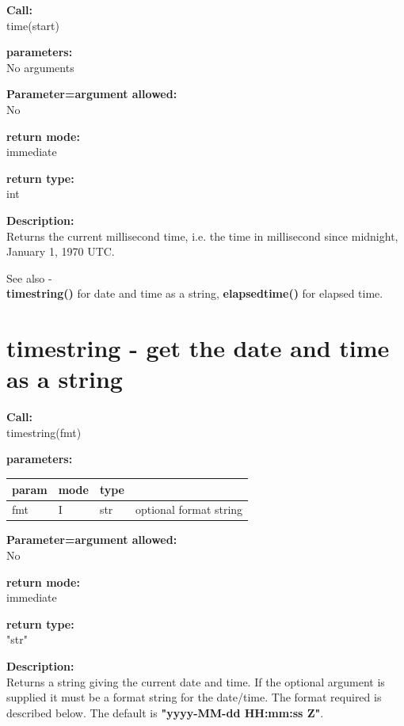         {\bf Call:} \\
        time(start)
        
        {\bf parameters:} \\
        No arguments
        
        {\bf Parameter=argument allowed:} \\
        No
        
        {\bf return mode:} \\
        immediate

        {\bf return type:} \\
        int
        
        {\bf Description:} \\
        Returns the current millisecond time, i.e. the time in millisecond
        since midnight, January 1, 1970 UTC.

        See also - \\
         {\bf timestring()} for date and time
        as a string,
         {\bf elapsedtime()} for
        elapsed time.
 

    \section{timestring - get the date and time as a string}\label{sec:iftimestring}
        
        {\bf Call:} \\
        timestring(fmt)
        
        {\bf parameters:} \\
        \begin{tabular}{| l | l | l | l |}
        \hline
        param  & mode & type & \\
        \hline \hline
        fmt & I & str & optional format string   \\ \hline
        \end{tabular}
        
        {\bf Parameter=argument allowed:} \\
        No
        
        {\bf return mode:} \\
        immediate

        {\bf return type:} \\
        "str"
        
        {\bf Description:} \\
        Returns a string giving the current date and time. If the optional
        argument is supplied it must be a format string for the date/time.
        The format required is described below. The default is
	{\bf "yyyy-MM-dd HH:mm:ss Z"}.

